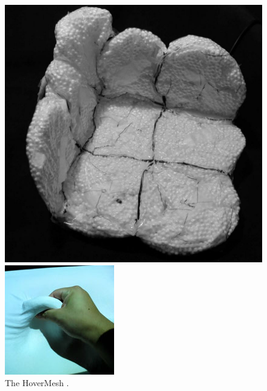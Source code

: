 \begin{figure}
  \centering
  \begin{minipage}[t]{.44\textwidth}
    \centering
    \includegraphics[width=\linewidth]{figures/jamming/hovermesh}
    \caption[The HoverMesh by \citet{mazzone2004hovermesh}.]
    {The HoverMesh \citep{mazzone2004hovermesh}.}
    \label{fig:ch:jamming:hovermesh}
  \end{minipage}%
  \hspace{0.02\textwidth}
  \begin{minipage}[t]{.44\textwidth}
    \centering
    \includegraphics[width=\linewidth]{figures/jamming/claytric-surface}

\end{minipage}
\end{figure}
